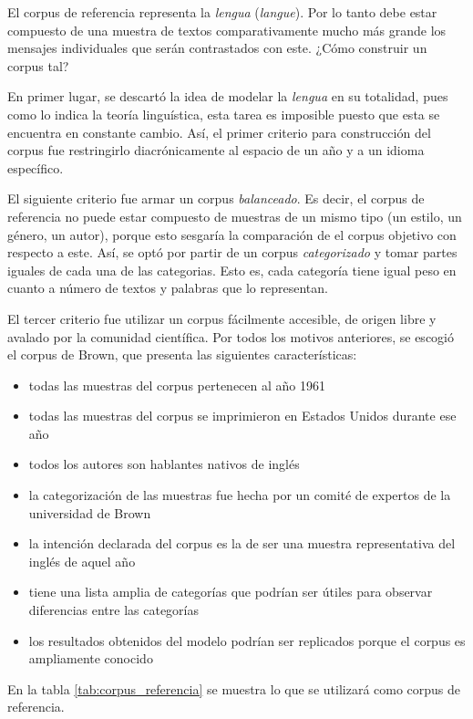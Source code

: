 \documentclass[12pt,letterpaper,twoside]{article}
\begin{document}
El corpus de referencia representa la \emph{lengua} (\emph{langue}). Por lo
tanto debe estar compuesto de una muestra de textos
comparativamente mucho más grande los mensajes individuales que
serán contrastados con este. ¿Cómo construir un corpus tal?

En primer lugar, se descartó la idea de modelar la \emph{lengua} en su
totalidad, pues como lo indica la teoría linguística, esta tarea
es imposible puesto que esta se encuentra en constante
cambio. Así, el primer criterio para construcción del corpus fue
restringirlo diacrónicamente al espacio de un año y a un idioma
específico.

El siguiente criterio fue armar un corpus \emph{balanceado}. Es decir,
el corpus de referencia no puede estar compuesto de muestras de
un mismo tipo (un estilo, un género, un autor), porque esto
sesgaría la comparación de el corpus objetivo con respecto a
este. Así, se optó por partir de un corpus \emph{categorizado} y tomar
partes iguales de cada una de las categorias. Esto es, cada
categoría tiene igual peso en cuanto a número de textos y
palabras que lo representan.

El tercer criterio fue utilizar un corpus fácilmente accesible,
de origen libre y avalado por la comunidad científica. Por todos
los motivos anteriores, se escogió el corpus de Brown, que
presenta las siguientes características:

\begin{itemize}
\item todas las muestras del corpus pertenecen al año 1961
\item todas las muestras del corpus se imprimieron en Estados Unidos durante ese año
\item todos los autores son hablantes nativos de inglés
\item la categorización de las muestras fue hecha por un comité de expertos de la universidad de Brown
\item la intención declarada del corpus es la de ser una muestra representativa del inglés de aquel año
\item tiene una lista amplia de categorías que podrían ser útiles para observar diferencias entre las categorías
\item los resultados obtenidos del modelo podrían ser replicados porque el corpus es ampliamente conocido
\end{itemize}

En la tabla \ref{tab:corpus_referencia} se muestra lo que se
utilizará como corpus de referencia.
\end{document}
